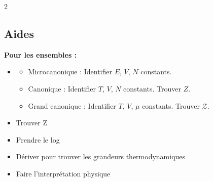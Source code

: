 \documentclass[11pt]{article}
\begin{document}
\begin{multicols}{2}
\subsection{Aides}
\textbf{Pour les ensembles :}
\begin{itemize}
  \item \begin{itemize}
          \item Microcanonique : Identifier $E$, $V$, $N$ constants.
          \item Canonique : Identifier $T$, $V$, $N$ constants. Trouver $Z$.
          \item Grand canonique : Identifier $T$, $V$, $\mu$ constants. Trouver $\mathcal{Z}$.
        \end{itemize}
  \item Trouver Z
  \item Prendre le log
  \item Dériver pour trouver les grandeurs thermodynamiques
  \item Faire l'interprétation physique
\end{itemize}



\end{multicols}
\end{document}
